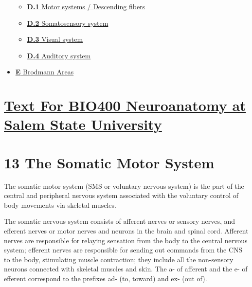 \begin{itemize}
  \begin{itemize}
  \tightlist
  \item
    \href{neural-pathways.html\#motor-systems-descending-fibers}{\emph{}\textbf{D.1}
    Motor systems / Descending fibers}
  \item
    \href{neural-pathways.html\#somatosensory-system}{\emph{}\textbf{D.2}
    Somatosensory system}
  \item
    \href{neural-pathways.html\#visual-system}{\emph{}\textbf{D.3}
    Visual system}
  \item
    \href{neural-pathways.html\#auditory-system}{\emph{}\textbf{D.4}
    Auditory system}
  \end{itemize}
\item
  \href{brodmann-areas.html}{\emph{}\textbf{E} Brodmann Areas}
\end{itemize}

\hypertarget{text-for-bio400-neuroanatomy-at-salem-state-university}{%
\section{\texorpdfstring{\emph{}\href{./}{Text For BIO400 Neuroanatomy
at Salem State
University}}{Text For BIO400 Neuroanatomy at Salem State University}}\label{text-for-bio400-neuroanatomy-at-salem-state-university}}

\hypertarget{section-}{}
\hypertarget{the-somatic-motor-system}{%
\section{\texorpdfstring{{13} The Somatic Motor
System}{13 The Somatic Motor System}}\label{the-somatic-motor-system}}

The somatic motor system (SMS or voluntary nervous system) is the part
of the central and peripheral nervous system associated with the
voluntary control of body movements via skeletal muscles.

The somatic nervous system consists of afferent nerves or sensory
nerves, and efferent nerves or motor nerves and neurons in the brain and
spinal cord. Afferent nerves are responsible for relaying sensation from
the body to the central nervous system; efferent nerves are responsible
for sending out commands from the CNS to the body, stimulating muscle
contraction; they include all the non-sensory neurons connected with
skeletal muscles and skin. The a- of afferent and the e- of efferent
correspond to the prefixes ad- (to, toward) and ex- (out of).


